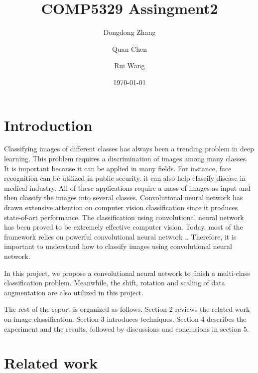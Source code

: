 \documentclass[twoside,twocolumn,10.8pt]{article}
\title{COMP5329 Assingment2} %
\author[1]{Dongdong Zhang}
\author[2]{Quan Chen}
\author[3]{Rui Wang}
\affil[1,2,3]{University of Sydney}
{	
    \makeatletter
    \renewcommand\AB@affilsepx{: \protect\Affilfont}
    \makeatother

    \affil[ ]{Student ID}

    \makeatletter
    \renewcommand\AB@affilsepx{, \protect\Affilfont}
    \makeatother

    \affil[1]{470161133}
    \affil[2]{470199228}
    \affil[3]{470208162}
}
\date{\today} %
\begin{document}
\maketitle


\section{Introduction}

\lettrine[nindent=0em,lines=3]{C}{}lassifying images of different classes has always been a trending problem in deep learning. This problem requires a discrimination of images among many classes. It is important because it can be applied in many fields. For instance, face recognition can be utilized in public security. it can also help classify disease in medical industry. All of these applications require a mass of images as input and then classify the images into several classes. Convolutional neural network has drawn extensive attention on computer vision classification since it produces state-of-art performance. The classification using convolutional neural network has been proved to be extremely effective computer vision. Today, most of the framework relies on powerful convolutional neural network \cite{R1}.. Therefore, it is important to understand how to classify images using convolutional neural network. 


\noindent In this project, we propose a convolutional neural network to finish a multi-class classification problem. Meanwhile, the shift, rotation and scaling of data augmentation are also utilized in this project.

\noindent The rest of the report is organized as follows. Section 2 reviews the related work on image classification. Section 3 introduces techniques. Section 4 describes the experiment and the results, followed by discussions and conclusions in section 5.


\section{Related work}
\end{document}
